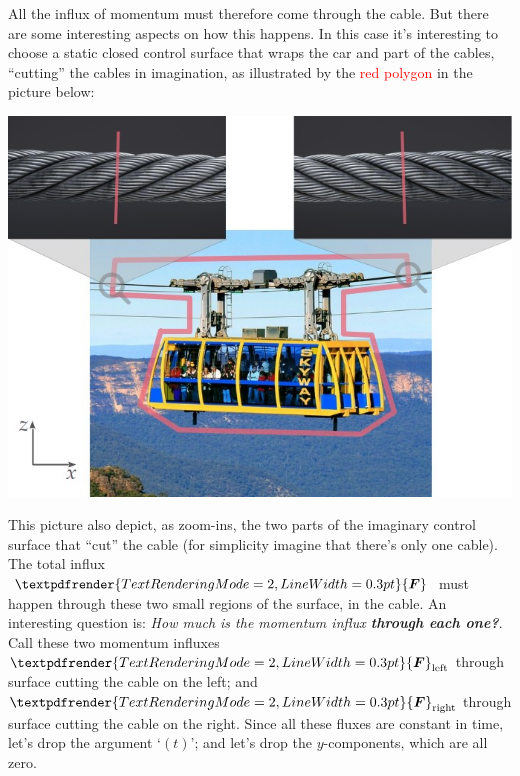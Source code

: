 \documentclass[a4paper,12pt,%
onecolumn,oneside,%
british%
]{memoir}
\renewcommand*{\bm}[1]{\textpdfrender{TextRenderingMode=2,LineWidth=0.3pt}{\boldsymbol{#1}}}
\renewcommand*{\|}[1][]{\nonscript\:#1\vert\nonscript\:\mathopen{}}
\newcommand*{\yF}{\bm{F}}
\begin{document}
All the influx of momentum must therefore come through the cable. But there are some interesting aspects on how this happens. In this case it's interesting to choose a static closed control surface that wraps the car and part of the cables,  \enquote{cutting} the cables in imagination, as illustrated by the \textcolor{red}{red polygon} in the picture below:
\begin{center}
  \includegraphics[align=t,width=\linewidth]{images/cablecardraw.jpg}
\end{center}
This picture also depict, as zoom-ins, the two parts of the imaginary control surface that \enquote{cut} the cable (for simplicity imagine that there's only one cable). The total influx $\yF$ must happen through these two small regions of the surface, in the cable. An interesting question is: \emph{How much is the momentum influx \textbf{through each one?}}. Call these two momentum influxes $\yF_{\text{left}}$ through surface cutting the cable on the left; and $\yF_{\text{right}}$ through surface cutting the cable on the right. Since all these fluxes are constant in time, let's drop the argument \enquote*{$(t)$}; and let's drop the $y$-components, which are all zero.
\end{document}
